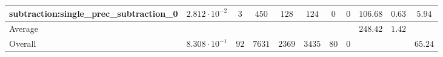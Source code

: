 \begin{tabular}{|l|c|c|c|c|c|c|c|c|c|c|}
subtraction:single\_prec\_subtraction\_0         & $ 2.812 \cdot 10^{-2} $ & $ 3      $ & $ 450  $ & $ 128  $ & $ 124   $ & $ 0  $ & $ 0 $ & $ 106.68      $ & $ 0.63    $ & $ 5.94    $ \\
\hline
Average                                          & $                     $ & $        $ & $      $ & $      $ & $       $ & $    $ & $   $ & $ 248.42      $ & $ 1.42    $ & $         $ \\
\hline
Overall                                          & $ 8.308 \cdot 10^{-1} $ & $ 92     $ & $ 7631 $ & $ 2369 $ & $ 3435  $ & $ 80 $ & $ 0 $ & $             $ & $         $ & $ 65.24   $ \\
\hline
\end{tabular}
